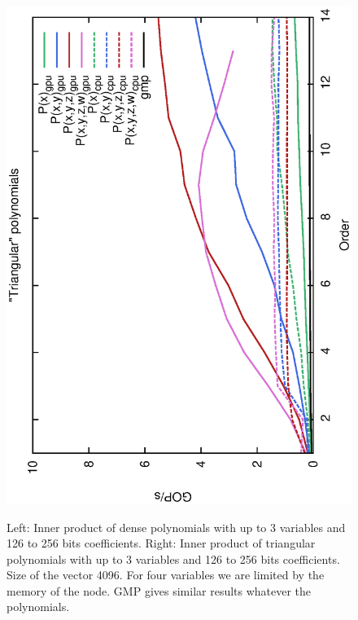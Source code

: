 \documentclass[oribibl]{llncs2e/llncs}
\begin{document}
\begin{itemize}
\begin{figure}[t!]
\begin{center}
{        \hspace{-0.4cm}
        \includegraphics[scale=0.37, angle=-90]{MC128.eps} 
    }
    \caption{Left: Inner product of dense polynomials with up to 3 variables and 126 to 256 bits coefficients. Right: Inner product of triangular polynomials with up to 3 variables and 126 to 256 bits coefficients.  Size of the vector 4096. For four variables we are limited by the memory of the node. GMP gives similar results whatever the polynomials.}
    \label{ResME}
    \end{center}
\end{figure}


\end{itemize}
\end{document}
